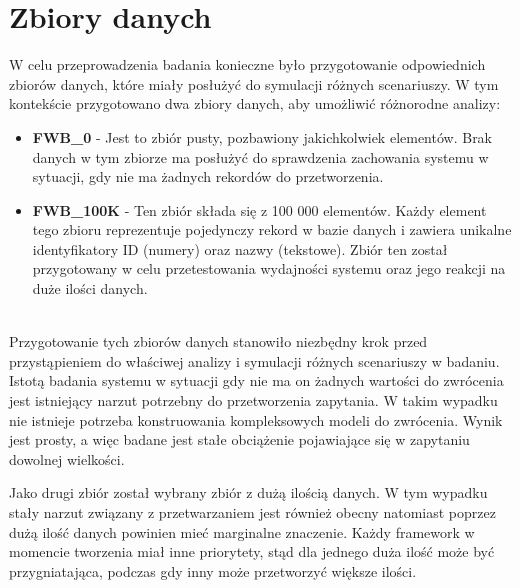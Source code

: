 \section{Zbiory danych}

W celu przeprowadzenia badania konieczne było przygotowanie odpowiednich zbiorów danych, które miały posłużyć do symulacji różnych scenariuszy.
W tym kontekście przygotowano dwa zbiory danych, aby umożliwić różnorodne analizy:

\begin{itemize}
  \item \textbf{FWB\_0} - Jest to zbiór pusty, pozbawiony jakichkolwiek elementów. Brak danych w tym zbiorze ma posłużyć do sprawdzenia zachowania systemu w sytuacji, gdy nie ma żadnych rekordów do przetworzenia.
  \item \textbf{FWB\_100K} - Ten zbiór składa się z 100 000 elementów. Każdy element tego zbioru reprezentuje pojedynczy rekord w bazie danych i zawiera unikalne identyfikatory ID (numery) oraz nazwy (tekstowe). Zbiór ten został przygotowany w celu przetestowania wydajności systemu oraz jego reakcji na duże ilości danych.
\end{itemize}
\phantom
\\

Przygotowanie tych zbiorów danych stanowiło niezbędny krok przed przystąpieniem do właściwej analizy i symulacji różnych scenariuszy w badaniu. 
Istotą badania systemu w sytuacji gdy nie ma on żadnych wartości do zwrócenia jest istniejący narzut potrzebny do przetworzenia zapytania.
W takim wypadku nie istnieje potrzeba konstruowania kompleksowych modeli do zwrócenia.
Wynik jest prosty, a więc badane jest stałe obciążenie pojawiające się w zapytaniu dowolnej wielkości.

Jako drugi zbiór został wybrany zbiór z dużą ilością danych.
W tym wypadku stały narzut związany z przetwarzaniem jest również obecny natomiast poprzez dużą ilość danych powinien mieć marginalne znaczenie.
Każdy framework w momencie tworzenia miał inne priorytety, stąd dla jednego duża ilość może być przygniatająca, podczas gdy inny może przetworzyć większe ilości.